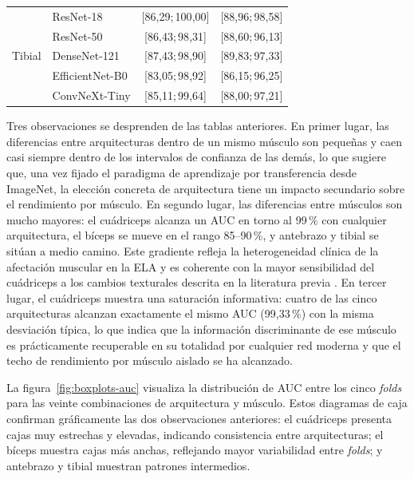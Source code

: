\documentclass[12pt]{extarticle}
\numberwithin{equation}{section}
\begin{document}
\begin{refsection}
\begin{table}[h!]
\begin{tabular}{llcc}
\midrule
\multirow{5}{*}{Tibial}     & ResNet-18       & [86{,}29;\,100{,}00]  & [88{,}96;\,98{,}58] \\
                            & ResNet-50       & [86{,}43;\,98{,}31]   & [88{,}60;\,96{,}13] \\
                            & DenseNet-121    & [87{,}43;\,98{,}90]   & [89{,}83;\,97{,}33] \\
                            & EfficientNet-B0 & [83{,}05;\,98{,}92]   & [86{,}15;\,96{,}25] \\
                            & ConvNeXt-Tiny   & [85{,}11;\,99{,}64]   & [88{,}00;\,97{,}21] \\
\bottomrule
\end{tabular}
\end{table}

Tres observaciones se desprenden de las tablas anteriores. En primer lugar, las diferencias entre arquitecturas dentro de un mismo músculo son pequeñas y caen casi siempre dentro de los intervalos de confianza de las demás, lo que sugiere que, una vez fijado el paradigma de aprendizaje por transferencia desde ImageNet, la elección concreta de arquitectura tiene un impacto secundario sobre el rendimiento por músculo. En segundo lugar, las diferencias entre músculos son mucho mayores: el cuádriceps alcanza un AUC en torno al 99\,\% con cualquier arquitectura, el bíceps se mueve en el rango 85--90\,\%, y antebrazo y tibial se sitúan a medio camino. Este gradiente refleja la heterogeneidad clínica de la afectación muscular en la ELA y es coherente con la mayor sensibilidad del cuádriceps a los cambios texturales descrita en la literatura previa \cite{martinezpaya2017quantitative,pillen2008muscle}. En tercer lugar, el cuádriceps muestra una saturación informativa: cuatro de las cinco arquitecturas alcanzan exactamente el mismo AUC (99{,}33\,\%) con la misma desviación típica, lo que indica que la información discriminante de ese músculo es prácticamente recuperable en su totalidad por cualquier red moderna y que el techo de rendimiento por músculo aislado se ha alcanzado.

La figura~\ref{fig:boxplots-auc} visualiza la distribución de AUC entre los cinco \textit{folds} para las veinte combinaciones de arquitectura y músculo. Estos diagramas de caja confirman gráficamente las dos observaciones anteriores: el cuádriceps presenta cajas muy estrechas y elevadas, indicando consistencia entre arquitecturas; el bíceps muestra cajas más anchas, reflejando mayor variabilidad entre \textit{folds}; y antebrazo y tibial muestran patrones intermedios.


\end{refsection}
\end{document}

